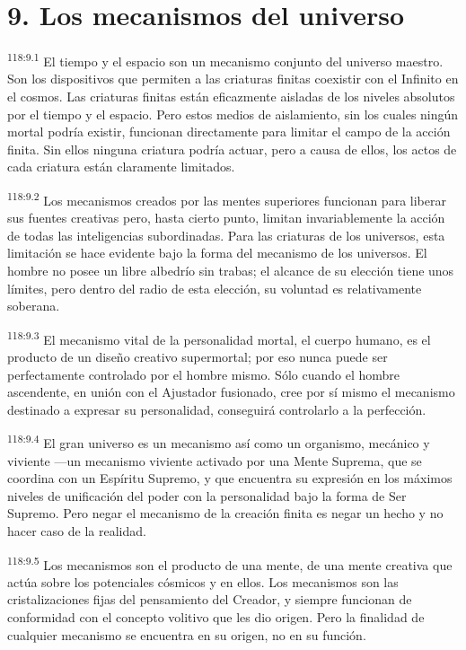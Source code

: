\section*{9. Los mecanismos del universo}
\par
\textsuperscript{118:9.1} El tiempo y el espacio son un mecanismo conjunto del universo maestro. Son los dispositivos que permiten a las criaturas finitas coexistir con el Infinito en el cosmos. Las criaturas finitas están eficazmente aisladas de los niveles absolutos por el tiempo y el espacio. Pero estos medios de aislamiento, sin los cuales ningún mortal podría existir, funcionan directamente para limitar el campo de la acción finita. Sin ellos ninguna criatura podría actuar, pero a causa de ellos, los actos de cada criatura están claramente limitados.

\par
\textsuperscript{118:9.2} Los mecanismos creados por las mentes superiores funcionan para liberar sus fuentes creativas pero, hasta cierto punto, limitan invariablemente la acción de todas las inteligencias subordinadas. Para las criaturas de los universos, esta limitación se hace evidente bajo la forma del mecanismo de los universos. El hombre no posee un libre albedrío sin trabas; el alcance de su elección tiene unos límites, pero dentro del radio de esta elección, su voluntad es relativamente soberana.

\par
\textsuperscript{118:9.3} El mecanismo vital de la personalidad mortal, el cuerpo humano, es el producto de un diseño creativo supermortal; por eso nunca puede ser perfectamente controlado por el hombre mismo. Sólo cuando el hombre ascendente, en unión con el Ajustador fusionado, cree por sí mismo el mecanismo destinado a expresar su personalidad, conseguirá controlarlo a la perfección.

\par
\textsuperscript{118:9.4} El gran universo es un mecanismo así como un organismo, mecánico y viviente ---un mecanismo viviente activado por una Mente Suprema, que se coordina con un Espíritu Supremo, y que encuentra su expresión en los máximos niveles de unificación del poder con la personalidad bajo la forma de Ser Supremo. Pero negar el mecanismo de la creación finita es negar un hecho y no hacer caso de la realidad.

\par
\textsuperscript{118:9.5} Los mecanismos son el producto de una mente, de una mente creativa que actúa sobre los potenciales cósmicos y en ellos. Los mecanismos son las cristalizaciones fijas del pensamiento del Creador, y siempre funcionan de conformidad con el concepto volitivo que les dio origen. Pero la finalidad de cualquier mecanismo se encuentra en su origen, no en su función.

